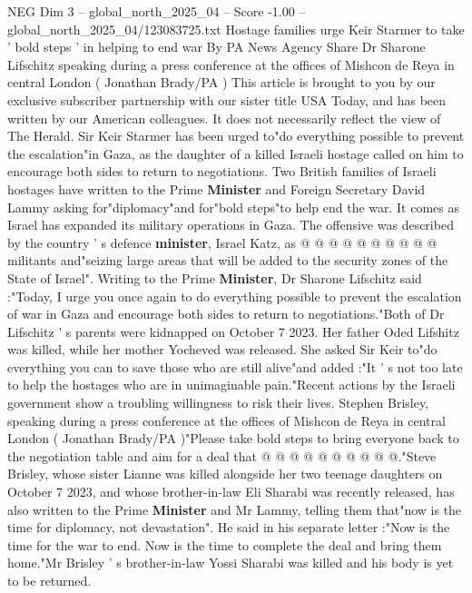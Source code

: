 \begin{textsample}{NEG Dim 3 – global\_north\_2025\_04 – Score -1.00 – global\_north\_2025\_04/123083725.txt}  \label{ex:f3_neg_405}
Hostage families urge Keir Starmer to take ' bold steps ' in helping to end war By PA News Agency Share Dr Sharone Lifschitz speaking during a press conference at the offices of Mishcon de Reya in central London ( Jonathan Brady/PA ) This article is brought to you by our exclusive subscriber partnership with our sister title USA Today, and has been written by our American colleagues.
It does not necessarily reflect the view of The Herald.
Sir Keir Starmer has been urged to"do everything possible to prevent the escalation"in Gaza, as the daughter of a killed Israeli hostage called on him to encourage both sides to return to negotiations.
Two British families of Israeli hostages have written to the Prime \textbf{Minister} and Foreign Secretary David Lammy asking for"diplomacy"and for"bold steps"to help end the war.
It comes as Israel has expanded its military operations in Gaza.
The offensive was described by the country ' s defence \textbf{minister}, Israel Katz, as @ @ @ @ @ @ @ @ @ @ militants and"seizing large areas that will be added to the security zones of the State of Israel".
Writing to the Prime \textbf{Minister}, Dr Sharone Lifschitz said :"Today, I urge you once again to do everything possible to prevent the escalation of war in Gaza and encourage both sides to return to negotiations."Both of Dr Lifschitz ' s parents were kidnapped on October 7 2023.
Her father Oded Lifshitz was killed, while her mother Yocheved was released.
She asked Sir Keir to"do everything you can to save those who are still alive"and added :"It ' s not too late to help the hostages who are in unimaginable pain."Recent actions by the Israeli government show a troubling willingness to risk their lives.
Stephen Brisley, speaking during a press conference at the offices of Mishcon de Reya in central London ( Jonathan Brady/PA )"Please take bold steps to bring everyone back to the negotiation table and aim for a deal that @ @ @ @ @ @ @ @ @ @."Steve Brisley, whose sister Lianne was killed alongside her two teenage daughters on October 7 2023, and whose brother-in-law Eli Sharabi was recently released, has also written to the Prime \textbf{Minister} and Mr Lammy, telling them that"now is the time for diplomacy, not devastation".
He said in his separate letter :"Now is the time for the war to end.
Now is the time to complete the deal and bring them home."Mr Brisley ' s brother-in-law Yossi Sharabi was killed and his body is yet to be returned.

\end{textsample}
